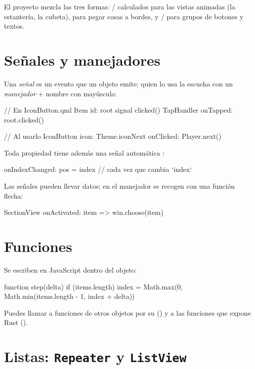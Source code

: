 El proyecto mezcla las tres formas: / calculados para las vistas animadas (la
estantería, la cubeta),  para pegar cosas a bordes, y / para
grupos de botones y textos.

\section{Señales y manejadores}

Una \emph{señal} es un evento que un objeto emite; quien lo usa la escucha con un
\emph{manejador}  + nombre con mayúscula:

\begin{qml}
// En IconButton.qml
Item {
    id: root
    signal clicked()
    TapHandler { onTapped: root.clicked() }
}

// Al usarlo
IconButton {
    icon: Theme.iconNext
    onClicked: Player.next()
}
\end{qml}

Toda propiedad tiene además una señal automática :

\begin{qml}
onIndexChanged: pos = index           // cada vez que cambia `index`
\end{qml}

Las señales pueden llevar datos; en el manejador se recogen con una función flecha:

\begin{qml}
SectionView { onActivated: item => win.choose(item) }
\end{qml}

\section{Funciones}

Se escriben en JavaScript dentro del objeto:

\begin{qml}
function step(delta) {
    if (items.length)
        index = Math.max(0, Math.min(items.length - 1, index + delta))
}
\end{qml}

Puedes llamar a funciones de otros objetos por su  () y a las
funciones que expone Rust ().

\section{Listas: \texttt{Repeater} y \texttt{ListView}}

